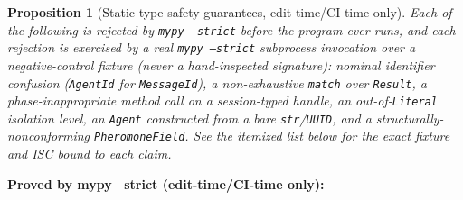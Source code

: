 \documentclass[
  english,
]{article}
\newtheorem{proposition}[theorem]{Proposition}
\theoremstyle{definition}
\begin{document}
\begin{proposition}[Static type-safety guarantees, edit-time/CI-time only]
Each of the following is rejected by \texttt{mypy --strict} before the program ever runs, and each
rejection is exercised by a real \texttt{mypy --strict} subprocess invocation over a negative-control
fixture (never a hand-inspected signature): nominal identifier confusion (\texttt{AgentId} for
\texttt{MessageId}), a non-exhaustive \texttt{match} over \texttt{Result}, a phase-inappropriate method
call on a session-typed handle, an out-of-\texttt{Literal} isolation level, an \texttt{Agent}
constructed from a bare \texttt{str}/\texttt{UUID}, and a structurally-nonconforming
\texttt{PheromoneField}. See the itemized list below for the exact fixture and ISC bound to each claim.
\end{proposition}

\textbf{Proved by mypy --strict (edit-time/CI-time only):}
\end{document}

